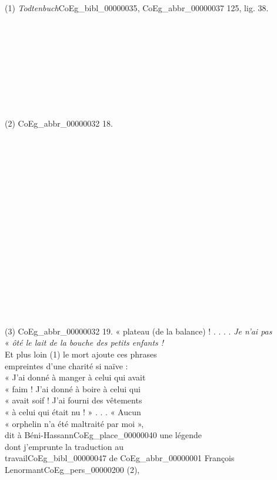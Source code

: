 \documentclass{book}
\begin{document}
{\begin{paracol}{2}
\noindent \\
\\
(1) \textit{Todtenbuch}\gls{CoEg_bibl_00000035}, \gls{CoEg_abbr_00000037} 125, lig. 38.\\
\\
\\
\\
\\
\\
\\
\\
\\
\\
(2) \gls{CoEg_abbr_00000032} 18.\\
\\
\\
\\
\\
\\
\\
\\
\\
\\
\\
\\
\\
\\
\\
\\
\\
\\
(3) \gls{CoEg_abbr_00000032} 19.
\switchcolumn
\noindent « plateau (de la balance) ! . . . . \textit{Je n’ai pas}\\
« \textit{ôté le lait de la bouche des petits enfants !}\\
Et plus loin (1) le mort ajoute ces phrases\\
empreintes d’une charité si naïve :\\
« J’ai donné à manger à celui qui avait\\
« faim ! J’ai donné à boire à celui qui\\
« avait soif ! J’ai fourni des vêtements\\
« à celui qui était nu ! » . . . « Aucun\\
« orphelin n’a été maltraité par moi »,\\
dit à Béni-Hassann\gls{CoEg_place_00000040} une légende\\
dont j’emprunte la traduction au\\
travail\gls{CoEg_bibl_00000047} de \gls{CoEg_abbr_00000001} François Lenormant\gls{CoEg_pers_00000200} (2),\\

\end{paracol}}
\end{document}
